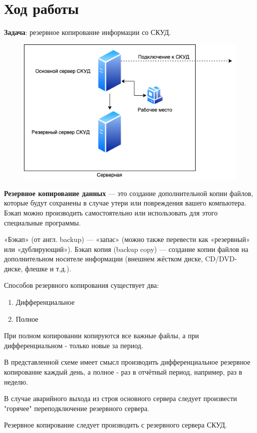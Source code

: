 \section{Ход работы}

\textbf{Задача}: резервное копирование информации со СКУД.

\begin{figure}[H]
	\centering
	\includegraphics[width=0.7\linewidth]{"img/skud"}
\end{figure}

\textbf{Резервное копирование данных} — это создание дополнительной копии файлов, которые будут сохранены в случае утери или повреждения вашего компьютера. Бэкап можно производить самостоятельно или использовать для этого специальные программы. 

«Бэкап» (от англ. backup) — «запас» (можно также перевести как «резервный» или «дублирующий»). Бэкап копия (backup copy) — создание копии файлов на дополнительном носителе информации (внешнем жёстком диске, CD/DVD-диске, флешке и т.д.). 

Способов резервного копирования существует два:
\begin{enumerate}
	\item Дифференциальное
	\item Полное
\end{enumerate}

При полном копировании копируются все важные файлы, а при дифференциальном - только новые за период.

В представленной схеме имеет смысл производить дифференциальное резервное копирование каждый день, а полное - раз в отчётный период, например, раз в неделю.

В случае аварийного выхода из строя основного сервера следует произвести "горячее" переподключение резервного сервера.

Резервное копирование следует производить с резервного сервера СКУД.


